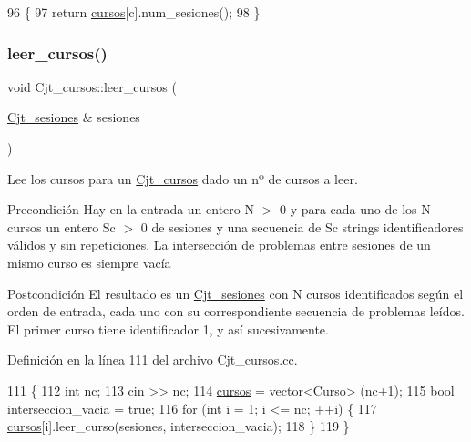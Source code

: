 \begin{DoxyCode}
96                                             \{
97       \textcolor{keywordflow}{return} \mbox{\hyperlink{class_cjt__cursos_a582f9540bc295212450dba4cd18c8886}{cursos}}[c].num\_sesiones();
98     \}
\end{DoxyCode}
\mbox{\label{class_cjt__cursos_a71a9a083e2abceee34329462a804637a}} 
\subsubsection{\texorpdfstring{leer\+\_\+cursos()}{leer\_cursos()}}
{\footnotesize\ttfamily void Cjt\+\_\+cursos\+::leer\+\_\+cursos (\begin{DoxyParamCaption}\item[{\mbox{\hyperlink{class_cjt__sesiones}{Cjt\+\_\+sesiones}} \&}]{sesiones }\end{DoxyParamCaption})}



Lee los cursos para un \mbox{\hyperlink{class_cjt__cursos}{Cjt\+\_\+cursos}} dado un nº de cursos a leer. 

\begin{DoxyPrecond}{Precondición}
Hay en la entrada un entero N $>$ 0 y para cada uno de los N cursos un entero Sc $>$ 0 de sesiones y una secuencia de Sc strings identificadores válidos y sin repeticiones. La intersección de problemas entre sesiones de un mismo curso es siempre vacía 
\end{DoxyPrecond}
\begin{DoxyPostcond}{Postcondición}
El resultado es un \mbox{\hyperlink{class_cjt__sesiones}{Cjt\+\_\+sesiones}} con N cursos identificados según el orden de entrada, cada uno con su correspondiente secuencia de problemas leídos. El primer curso tiene identificador 1, y así sucesivamente. 
\end{DoxyPostcond}


Definición en la línea 111 del archivo Cjt\+\_\+cursos.\+cc.


\begin{DoxyCode}
111                                                        \{
112       \textcolor{keywordtype}{int} nc;
113       cin >> nc;
114       \mbox{\hyperlink{class_cjt__cursos_a582f9540bc295212450dba4cd18c8886}{cursos}} = vector<Curso> (nc+1);
115       \textcolor{keywordtype}{bool} interseccion\_vacia = \textcolor{keyword}{true};
116       \textcolor{keywordflow}{for} (\textcolor{keywordtype}{int} i = 1; i <= nc; ++i) \{
117         \mbox{\hyperlink{class_cjt__cursos_a582f9540bc295212450dba4cd18c8886}{cursos}}[i].leer\_curso(sesiones, interseccion\_vacia);
118       \}
119     \}
\end{DoxyCode}
\mbox{\label{class_cjt__cursos_acc9074c9338d31947bdd84e3498580be}} 
